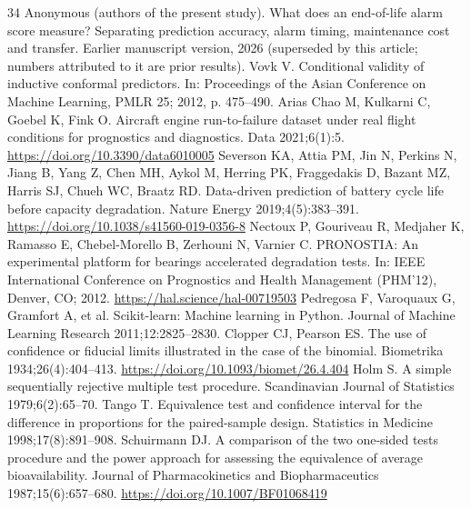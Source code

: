 \begin{thebibliography}{34}
 Anonymous (authors of the present study). What does an end-of-life alarm score measure? Separating prediction accuracy, alarm timing, maintenance cost and transfer. Earlier manuscript version, 2026 (superseded by this article; numbers attributed to it are prior results).
 Vovk V. Conditional validity of inductive conformal predictors. In: Proceedings of the Asian Conference on Machine Learning, PMLR 25; 2012, p. 475--490.
 Arias Chao M, Kulkarni C, Goebel K, Fink O. Aircraft engine run-to-failure dataset under real flight conditions for prognostics and diagnostics. Data 2021;6(1):5. \url{https://doi.org/10.3390/data6010005}
 Severson KA, Attia PM, Jin N, Perkins N, Jiang B, Yang Z, Chen MH, Aykol M, Herring PK, Fraggedakis D, Bazant MZ, Harris SJ, Chueh WC, Braatz RD. Data-driven prediction of battery cycle life before capacity degradation. Nature Energy 2019;4(5):383--391. \url{https://doi.org/10.1038/s41560-019-0356-8}
 Nectoux P, Gouriveau R, Medjaher K, Ramasso E, Chebel-Morello B, Zerhouni N, Varnier C. PRONOSTIA: An experimental platform for bearings accelerated degradation tests. In: IEEE International Conference on Prognostics and Health Management (PHM'12), Denver, CO; 2012. \url{https://hal.science/hal-00719503}
 Pedregosa F, Varoquaux G, Gramfort A, et al. Scikit-learn: Machine learning in Python. Journal of Machine Learning Research 2011;12:2825--2830.
 Clopper CJ, Pearson ES. The use of confidence or fiducial limits illustrated in the case of the binomial. Biometrika 1934;26(4):404--413. \url{https://doi.org/10.1093/biomet/26.4.404}
 Holm S. A simple sequentially rejective multiple test procedure. Scandinavian Journal of Statistics 1979;6(2):65--70.
 Tango T. Equivalence test and confidence interval for the difference in proportions for the paired-sample design. Statistics in Medicine 1998;17(8):891--908.
 Schuirmann DJ. A comparison of the two one-sided tests procedure and the power approach for assessing the equivalence of average bioavailability. Journal of Pharmacokinetics and Biopharmaceutics 1987;15(6):657--680. \url{https://doi.org/10.1007/BF01068419}
\end{thebibliography}
